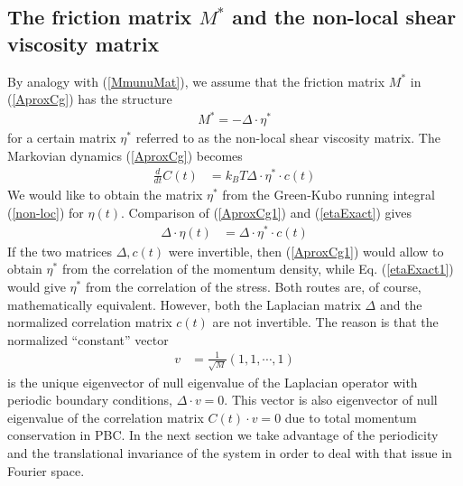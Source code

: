 \documentclass[a4paper,openright,12pt]{book}
\newcommand{\esc}{\!\cdot\!}
\begin{document}
\subsection{The  friction   matrix  $M^*$  and  the   non-local  shear
  viscosity matrix}
By analogy with  (\ref{MmunuMat}), we assume that the  friction matrix $M^*$ in
(\ref{AproxCg}) has the structure
\begin{align}
  M^*=-\Delta\esc \eta^*
\end{align}
for a  certain  matrix  $\eta^*$  referred to  as  the  non-local  shear
viscosity  matrix.  The Markovian  dynamics  (\ref{AproxCg})
becomes
\begin{align}
\frac{d}{dt}C(t)&=  k_BT\Delta\esc \eta^*\esc c(t)
\label{AproxCg1}
\end{align}
We  would like  to  obtain  the matrix  $\eta^*$  from the  Green-Kubo
running  integral   (\ref{non-loc})  for  $\eta(t)$.    Comparison  of
(\ref{AproxCg1}) and (\ref{etaExact}) gives
\begin{align}
 \Delta\esc \eta(t) &=\Delta\esc \eta^*\esc c(t)
\label{etaExact1}
\end{align}
If   the   two   matrices    $\Delta,c(t)$   were   invertible,   then
(\ref{AproxCg1}) would  allow to obtain $\eta^*$  from the correlation
of  the  momentum  density,  while Eq.  (\ref{etaExact1})  would  give
$\eta^*$  from the  correlation of  the  stress. Both  routes are,  of
course, mathematically equivalent.  However, both the Laplacian matrix
$\Delta$  and  the  normalized   correlation  matrix  $c(t)$  are  not
invertible.  The reason is that the normalized ``constant'' vector
\begin{align}
  v&=\frac{1}{\sqrt{M}}(1,1,\cdots,1)
\end{align}
is the unique eigenvector of null eigenvalue of the Laplacian operator
with periodic boundary conditions, $\Delta  \cdot v=0$. This vector is
also  eigenvector  of  null   eigenvalue  of  the  correlation  matrix
$C(t)\esc v=0$  due to total momentum  conservation in PBC. 
In the next section we take advantage of the periodicity and the translational invariance of the system in order to deal with that issue in Fourier space. 
\end{document}
